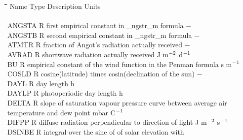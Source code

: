 \documentclass[11pt]{article}
\begin{document}
\begin{tabbing}
\hspace{1.27cm}\=\hspace{1.27cm}\=\hspace{1.27cm}\=\hspace{1.27cm}\=%
\hspace{1.27cm}\=\hspace{1.27cm}\=\hspace{1.27cm}\=\hspace{1.27cm}\=%
\hspace{1.27cm}\=\hspace{1.27cm}\=\kill
Name   \> Type \> Description                                        \> \> \> \> \> \> \> \> Units\\
-$-$$-$$-$   \> \> $-$$-$$-$$-$    \> $-$$-$$-$$-$$-$$-$$-$$-$$-$$-$$-$                                        \> \> \> \> \> \> \> $-$$-$$-$$-$$-$\\
ANGSTA \> \> R   \> first empirical constant in \_ngstr\_m formula             \> \> \> \> \> \> \> $-$\\
ANGSTB \> \> R   \> second empirical constant in \_ngstr\_m formula             \> \> \> \> \> \> \> $-$\\
ATMTR   \> \> R   \> fraction of Angot's radiation actually received    \> \> \> \> \> \> \> $-$\\
AVRAD   \> \> R   \> shortwave radiation actually received              \> \> \> \> \> \> \> J m$^{{\rm -2}}$ d$^{{\rm -1}}$\\
BU      \> \> R   \> empirical constant of the wind function in the Penman formula  \> \> \> \> \> \> \> s m$^{{\rm -1}}$  \\
COSLD   \> \> R   \> cosine(latitude) times cosin(declination of the sun)       \> \> \> \> \> \> \> $-$\\
DAYL    \> \> R   \> day length                                         \> \> \> \> \> \> \> h\\
DAYLP   \> \> R   \> photoperiodic day length                           \> \> \> \> \> \> \> h\\
DELTA   \> \> R   \> slope of saturation vapour pressure curve between average air \\
\>\> \> temperature and dew point \> \> \> \> \> \> \> mbar \degrees C$^{{\rm -1}}$\\
DIFPP\> \> R\> diffuse radiation perpendicular to direction of light\> \> \> \> \> \> \> J m$^{{\rm -2}}$ s$^{{\rm -1}}$\\
DSINBE\> \> R  \> integral over the sine of of solar elevation with\\
$$
\end{tabbing}
\end{document}
